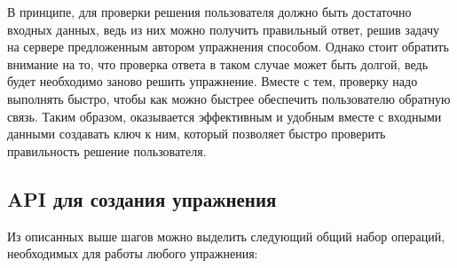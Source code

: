 \documentclass{matmex-diploma-custom}
\begin{document}
В принципе, для проверки решения пользователя должно быть достаточно
входных данных, ведь из них можно получить правильный ответ, решив
задачу на сервере предложенным автором упражнения способом. Однако
стоит обратить внимание на то, что проверка ответа в таком случае
может быть долгой, ведь будет необходимо заново решить
упражнение. Вместе с тем, проверку надо выполнять быстро, чтобы как
можно быстрее обеспечить пользователю обратную связь. Таким образом,
оказывается эффективным и удобным вместе с входными данными создавать
ключ к ним, который позволяет быстро проверить правильность решение
пользователя.

\subsection{API для создания упражнения}
Из описанных выше шагов можно выделить следующий общий набор операций,
необходимых для работы любого упражнения:
\end{document}
